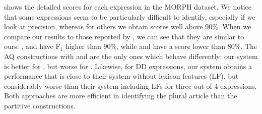 \documentclass[output=paper,
modfonts
]{langscibook}
\begin{document}
 shows the detailed scores for each expression in the MORPH dataset. We notice that some expressions seem to be particularly difficult to identify, especially if we look at precision, whereas for others we obtain scores well above 90\%. 
When we compare our results to those reported by \citet{nasr:acl:2015}, we can see that they are similar to ours: ,  and  have F$_1$ higher than 90\%, while  and  have a score lower than 80\%.  The AQ constructions with  and  are the only ones which behave differently: our system is better for , but worse for .
Likewise, for DD expressions, our system obtains a performance that is close to their system without lexicon features (LF), but considerably worse than their system including LFs for three out of 4 expressions. Both approaches are more efficient in identifying the plural article  than the partitive constructions. %
\end{document}
